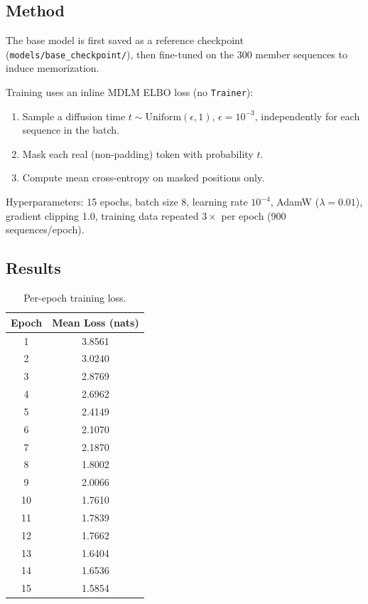 \documentclass[11pt,a4paper]{article}
\begin{document}
\subsection{Method}

The base model is first saved as a reference checkpoint
(\texttt{models/base\_checkpoint/}), then fine-tuned on the 300 member
sequences to induce memorization.

Training uses an inline MDLM ELBO loss (no \texttt{Trainer}):
\begin{enumerate}
  \item Sample a diffusion time $t \sim \mathrm{Uniform}(\epsilon, 1)$,
        $\epsilon = 10^{-3}$, independently for each sequence in the batch.
  \item Mask each real (non-padding) token with probability $t$.
  \item Compute mean cross-entropy on masked positions only.
\end{enumerate}

Hyperparameters: 15 epochs, batch size 8, learning rate $10^{-4}$,
AdamW ($\lambda = 0.01$), gradient clipping 1.0, training data repeated
$3\times$ per epoch (900 sequences/epoch).

\subsection{Results}

\begin{table}[H]
\centering
\caption{Per-epoch training loss.}
\label{tab:finetune}
\begin{tabular}{cc}
\toprule
Epoch & Mean Loss (nats) \\
\midrule
1  & 3.8561 \\
2  & 3.0240 \\
3  & 2.8769 \\
4  & 2.6962 \\
5  & 2.4149 \\
6  & 2.1070 \\
7  & 2.1870 \\
8  & 1.8002 \\
9  & 2.0066 \\
10 & 1.7610 \\
11 & 1.7839 \\
12 & 1.7662 \\
13 & 1.6404 \\
14 & 1.6536 \\
15 & 1.5854 \\
\bottomrule
\end{tabular}
\end{table}
\end{document}
